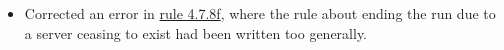 \begin{titlepage}
\begin{itemize}
	\item Corrected an error in \hyperlink{page.i}{rule 4.7.8f}, where the rule about ending the run due to a server ceasing to exist had been written too generally.
\end{itemize}

\end{titlepage}
